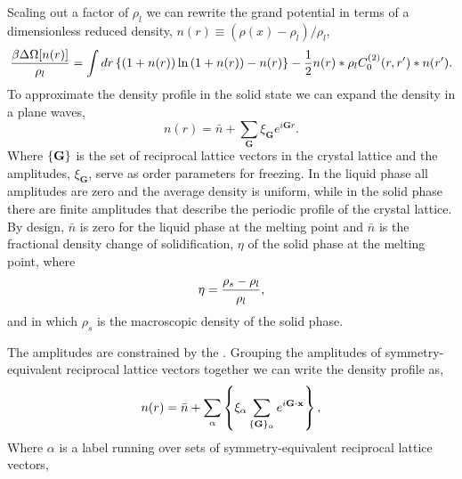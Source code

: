 Scaling out a factor of $\rho_l$ we can rewrite the grand potential in terms of
a dimensionless reduced density, $n(r) \equiv (\rho(x) - \rho_l)/\rho_l$,
%
\begin{equation}
    \label{gp}
    \frac{\beta \Delta \Omega[n(r)]}{\rho_l} =
        \int dr \left\lbrace 
            (1 + n(r))\ln\left(1 + n(r)\right) - n(r)\right\rbrace
        - \frac{1}{2} n(r) \ast \rho_l C^{(2)}_0(r, r^\prime) \ast n(r^\prime).
\end{equation}
%
To approximate the density profile in the solid state we can expand the density
in a plane waves,
%
\begin{equation}
    \label{expansion}
    n(r) = \bar{n} + \sum_{\mathbf{G}} \xi_{\mathbf{G}} e^{i \mathbf{G} r}.
\end{equation}
%
Where $\left\lbrace \mathbf{G} \right\rbrace$ is the set of reciprocal lattice
vectors in the crystal lattice and the amplitudes, $\xi_\mathbf{G}$, serve as
order parameters for freezing. In the liquid phase all amplitudes are zero and
the average density is uniform, while in the solid phase there are finite
amplitudes that describe the periodic profile of the crystal lattice. By
design, $\bar{n}$ is zero for the liquid phase at the melting point 
 and $\bar{n}$ is the fractional density 
change of solidification, $\eta$ of the solid phase at the melting point, where
%
\begin{equation}
    \label{eq:eta_def} 
    \eta = \frac{\rho_s - \rho_l}{\rho_l},
\end{equation}
%
and in which $\rho_s$ is the macroscopic density of the solid phase.

The amplitudes are constrained by the .
Grouping the amplitudes of symmetry-equivalent reciprocal lattice vectors
together we can write the density profile as,
%
\begin{equation}
    \label{amplitudes}
    n(r) = \bar{n}
         + \sum_\alpha \left\lbrace
            \xi_\alpha \sum_{\lbrace\mathbf{G}\rbrace_\alpha}
                e^{i\mathbf{G} \cdot \mathbf{x}}\right\rbrace,
\end{equation}
%
Where $\alpha$ is a label running over sets of symmetry-equivalent reciprocal
lattice vectors, 

